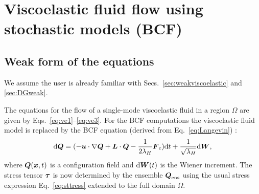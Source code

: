 
\def\headdate{6th February 2009}

\section{Viscoelastic fluid flow using stochastic models (BCF)}
\label{sec:bcfdg}

\subsection{Weak form of the equations}

We assume the user is already familiar with Secs.~\ref{sec:weakviscoelastic}
and \ref{sec:DGweak}.

The equations for the flow of a single-mode viscoelastic fluid
in a region $\Omega$ are given by Eqs.~\eqref{eq:ve1}--\eqref{eq:ve3}. For the
BCF computations the viscoelastic fluid model is replaced by the BCF equation
(derived from Eq.~\eqref{eq:Langevin}) \cite{Hulsen97}:
\begin{equation}
  \mathrm{d}\boldsymbol{Q}=
     (-\boldsymbol{u}\cdot\nabla\boldsymbol{Q}+\boldsymbol{L}\cdot\boldsymbol{Q} - \frac{1}{2\lambda_H}\boldsymbol{F}_c)
    \mathrm{d}t+\frac{1}{\sqrt{\lambda_H}}\mathrm{d}\boldsymbol{W},
\end{equation}
where $\boldsymbol{Q}(\boldsymbol{x},t)$ is a configuration field and
$\mathrm{d}\boldsymbol{W}(t)$ is the Wiener increment. The stress tensor
 $\boldsymbol{\tau}$ is now
determined by the ensemble $\boldsymbol{Q}_\text{ens}$ using the usual stress expression
Eq.~\eqref{eq:sttress} extended to the full domain $\Omega$.

